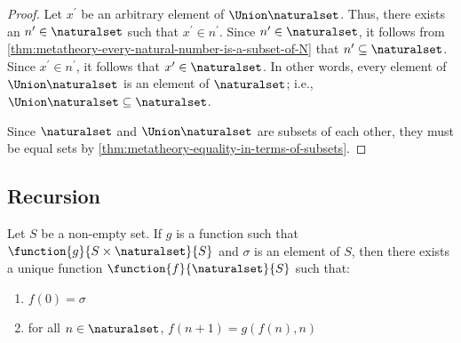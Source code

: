 \begin{proof}
    \vspace{0.3cm}
    \noindent
    Let \( x^{\prime} \) be an arbitrary element of \( \Union \naturalset \).
    Thus, there exists an \( n^{\prime} \in \naturalset \) such that \( x^{\prime} \in n^{\prime} \).
    Since \( n^{\prime} \in \naturalset \), it follows from \cref{thm:metatheory-every-natural-number-is-a-subset-of-N} that
    \( n^{\prime} \subseteq \naturalset \).
    Since \( x^{\prime} \in n^{\prime} \), it follows that \( x^{\prime} \in \naturalset \).
    In other words, every element of \( \Union \naturalset \) is an element of \( \naturalset \); i.e., \( \Union \naturalset \subseteq \naturalset \).

    \vspace{0.3cm}
    \noindent
    Since \( \naturalset \) and \( \Union \naturalset \) are subsets of each other, they must be equal sets by \cref{thm:metatheory-equality-in-terms-of-subsets}.
\end{proof}

\subsection{Recursion}

\begin{recursion-theorem}
     \label{recursion-theorem:standard-form}
    Let \( S \) be a non-empty set.
    If \( g \) is a function such that \( \function{g}{S \times \naturalset}{S} \) and \( \sigma \) is an element of \( S \),
    then there exists a unique function \( \function{f}{\naturalset}{S} \) such that:
    \begin{enumerate}[topsep=2pt,label=\textup{\texttt{(\alph*)}}]
        \item \( f(0) = \sigma \)
        \item for all \( n \in \naturalset \), \( f(n + 1) = g(f(n), n) \)
    \end{enumerate}
\end{recursion-theorem}

